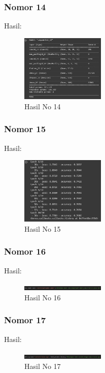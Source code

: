 \subsubsection{Nomor 14}
\hfill\break

Hasil:
\begin{figure}[H]
\centering
	\includegraphics[width=4cm]{figures/1174066/7/no14.jpg}
	\caption{Hasil No 14}
\end{figure}

\subsubsection{Nomor 15}
\hfill\break

Hasil:
\begin{figure}[H]
\centering
	\includegraphics[width=4cm]{figures/1174066/7/no15.jpg}
	\caption{Hasil No 15}
\end{figure}

\subsubsection{Nomor 16}
\hfill\break

Hasil:
\begin{figure}[H]
\centering
	\includegraphics[width=4cm]{figures/1174066/7/no16.jpg}
	\caption{Hasil No 16}
\end{figure}

\subsubsection{Nomor 17}
\hfill\break

Hasil:
\begin{figure}[H]
\centering
	\includegraphics[width=4cm]{figures/1174066/7/no17.jpg}
	\caption{Hasil No 17}
\end{figure}

